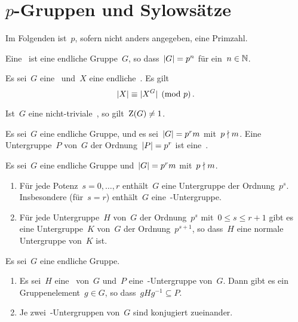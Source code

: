 \section{\texorpdfstring{$p$}{p}-Gruppen und Sylowsätze}

\begin{convention}
  Im Folgenden ist~$p$, sofern nicht anders angegeben, eine Primzahl.
\end{convention}

\begin{definition}
  Eine~ ist eine endliche Gruppe~$G$, so dass~$\lvert G\rvert = p^n$ für ein~$n \in \mathbb{N}$.
\end{definition}

\begin{proposition}
  Es sei~$G$ eine~ und~$X$ eine endliche~.
  Es gilt
  \[
    \lvert X\rvert \equiv \lvert X^G\rvert \pmod{p} \,.  
  \]
\end{proposition}

\begin{corollary}
  Ist~$G$ eine nicht-triviale~, so gilt~$\operatorname{Z}(G) \neq 1$.
\end{corollary}

\begin{definition}
  Es sei~$G$ eine endliche Gruppe, und es sei~$\lvert G\rvert = p^r m$ mit~$p \nmid m$.
  Eine Untergruppe~$P$ von~$G$ der Ordnung~$\lvert P\rvert = p^r$ ist eine~.
\end{definition}

\begin{theorem}
  Es sei~$G$ eine endliche Gruppe und~$\lvert G\rvert = p^r m$ mit~$p \nmid m$.
  \begin{enumerate}
    \item
      Für jede Potenz~$s = 0, \dotsc, r$ enthält~$G$ eine Untergruppe der Ordnung~$p^s$.
      Insbesondere (für~$s = r$) enthält~$G$ eine~-Untergruppe.
    \item
      Für jede Untergruppe~$H$ von~$G$ der Ordnung~$p^s$ mit~$0 \leq s \leq r+1$ gibt es eine Untergruppe~$K$ von~$G$ der Ordnung~$p^{s+1}$, so dass~$H$ eine normale Untergruppe von~$K$ ist.
  \end{enumerate}
\end{theorem}

\begin{theorem}
  Es sei~$G$ eine endliche Gruppe.
  \begin{enumerate}
    \item
      Es sei~$H$ eine~ von~$G$ und~$P$ eine~-Untergruppe von~$G$.
      Dann gibt es ein Gruppenelement~$g \in G$, so dass~$g H g^{-1} \subseteq P$.
    \item
      Je zwei~-Untergruppen von~$G$ sind konjugiert zueinander.
  \end{enumerate}
\end{theorem}

